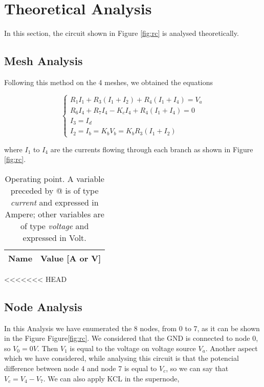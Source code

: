 \section{Theoretical Analysis}
\label{sec:analysis}

In this section, the circuit shown in Figure \ref{fig:rc} is analysed
theoretically.

\subsection{Mesh Analysis}
Following this method on the 4 meshes, we obtained the equations

\begin{equation}
\begin{cases}
R_1 I_1 + R_3 (I_1+I_2)+R_4(I_1+I_4)=V_a\\
R_6 I_4 + R_7 I_4 -K_c I_4 + R_4 (I_1+I_4)=0\\
I_3=I_d\\
I_2=I_b=K_b V_b = K_b R_3 (I_1+I_2)
\end{cases}
\end{equation}

where $I_1$ to $I_4$ are the currents flowing through each branch as shown in Figure \ref{fig:rc}.

\begin{table}[h]
  \centering
  \begin{tabular}{|l|r|}
    \hline    
    {\bf Name} & {\bf Value [A or V]} \\ \hline
    
 \end{tabular}
 \caption{Operating point. A variable preceded by @ is of type {\em current}
   and expressed in Ampere; other variables are of type {\it voltage} and expressed in
   Volt.}
  \label{tab:op}
\end{table}

<<<<<<< HEAD
\subsection{Node Analysis}
In this Analysis we have enumerated the 8 nodes, from 0 to 7, as it can be shown in the Figure Figure\ref{fig:rc}. We considered that the GND is connected to node 0, so $V_{0}=0V$. Then $V_1$ is equal to the voltage on voltage source $V_a$. Another aspect which we have considered, while analysing this circuit is that the potencial difference between node 4 and node 7 is equal to $V_c$, so we can say that $V_c=V_4-V_7$. We can also apply KCL in the supernode, 



